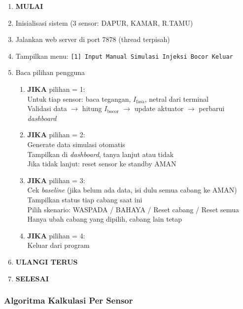 \documentclass[12pt,a4paper]{article}
\begin{document}
\begin{enumerate}
    \item \textbf{MULAI}
    \item Inisialisasi sistem (3 sensor: DAPUR, KAMAR, R.TAMU)
    \item Jalankan web server di port 7878 (thread terpisah)
    \item Tampilkan menu: \texttt{[1] Input Manual \quad [2] Simulasi \quad [3] Injeksi Bocor \quad [4] Keluar}
    \item Baca pilihan pengguna
    \begin{enumerate}[label=\alph*.]
        \item \textbf{JIKA} pilihan = 1:\\
              Untuk tiap sensor: baca tegangan, $I_{\text{fasa}}$, netral dari terminal\\
              Validasi data $\to$ hitung $I_{\text{bocor}}$ $\to$ update aktuator $\to$ perbarui \emph{dashboard}
        \item \textbf{JIKA} pilihan = 2:\\
              Generate data simulasi otomatis\\
              Tampilkan di \emph{dashboard}, tanya lanjut atau tidak\\
              Jika tidak lanjut: reset sensor ke standby AMAN
        \item \textbf{JIKA} pilihan = 3:\\
              Cek \emph{baseline} (jika belum ada data, isi dulu semua cabang ke AMAN)\\
              Tampilkan status tiap cabang saat ini\\
              Pilih skenario: WASPADA / BAHAYA / Reset cabang / Reset semua\\
              Hanya ubah cabang yang dipilih, cabang lain tetap
        \item \textbf{JIKA} pilihan = 4:\\
              Keluar dari program
    \end{enumerate}
    \item \textbf{ULANGI TERUS}
    \item \textbf{SELESAI}
\end{enumerate}

\subsubsection*{Algoritma Kalkulasi Per Sensor}
\end{document}
